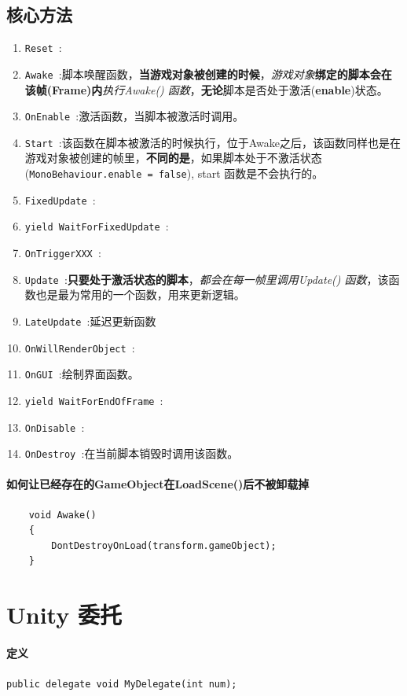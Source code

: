 \documentclass[UTF8,a4paper,12pt]{ctexbook}
\begin{document}
		\subsection{核心方法}
			\begin{enumerate}
				\item \verb|Reset |:
				\item \verb|Awake |:脚本唤醒函数，\textbf{当游戏对象被创建的时候}，\textit{游戏对象}\textbf{绑定的脚本会在该帧(Frame)内}\textit{执行Awake() 函数}，\textbf{无论}脚本是否处于激活(\textbf{enable})状态。
				\item \verb|OnEnable |:激活函数，当脚本被激活时调用。
				\item \verb|Start |:该函数在脚本被激活的时候执行，位于Awake之后，该函数同样也是在游戏对象被创建的帧里，\textbf{不同的是}，如果脚本处于不激活状态(\verb|MonoBehaviour.enable = false|), start 函数是不会执行的。
				\item \verb|FixedUpdate |:
				\item \verb|yield WaitForFixedUpdate |:
				\item \verb|OnTriggerXXX |:
				\item \verb|Update |:\textbf{只要处于激活状态的脚本}，\textit{都会在每一帧里调用Update() 函数}，该函数也是最为常用的一个函数，用来更新逻辑。
				\item \verb|LateUpdate |:延迟更新函数
				\item \verb|OnWillRenderObject |:
				\item \verb|OnGUI |:绘制界面函数。 
				\item \verb|yield WaitForEndOfFrame |:
				\item \verb|OnDisable |:
				\item \verb|OnDestroy |:在当前脚本销毁时调用该函数。
			\end{enumerate}
			
		\paragraph{如何让已经存在的GameObject在LoadScene()后不被卸载掉}
			\begin{lstlisting}
	void Awake()
	{
	    DontDestroyOnLoad(transform.gameObject);
	}
			\end{lstlisting}
	\section{Unity 委托}
		
		\paragraph{定义}\verb|public delegate void MyDelegate(int num);|
		
\end{document}
